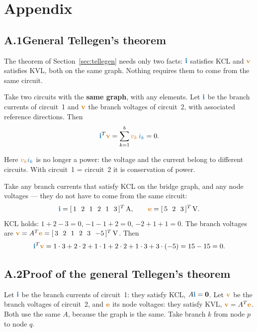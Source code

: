 \documentclass[11pt,a4paper]{article}
\newcommand{\Icol}[1]{\textcolor{ccur}{#1}}
\newcommand{\Vcol}[1]{\textcolor{cvolt}{#1}}
\newcommand{\uni}[1]{\,\mathrm{#1}}
\newcommand{\A}{\uni{A}}   \newcommand{\V}{\uni{V}}
\begin{document}
\clearpage
\section*{Appendix}

\subsection*{A.1\quad General Tellegen's theorem}

The theorem of Section~\ref{sec:tellegen} needs only two facts: $\Icol{\mathbf{i}}$
satisfies KCL and $\Vcol{\mathbf{v}}$ satisfies KVL, both on the same graph. Nothing requires
them to come from the same circuit.

\begin{ideabox}
Take two circuits with the \textbf{same graph}, with any elements. Let $\Icol{\mathbf{i}}$ be
the branch currents of circuit~1 and $\Vcol{\mathbf{v}}$ the branch voltages of circuit~2,
with associated reference directions. Then
\[
  \Icol{\mathbf{i}}^T\Vcol{\mathbf{v}} = \sum_{k=1}^{b} \Vcol{v_k}\,\Icol{i_k} = 0 .
\]
\end{ideabox}

Here $\Vcol{v_k}\Icol{i_k}$ is no longer a power: the voltage and the current belong to
different circuits. With circuit~1 = circuit~2 it is conservation of power.

\begin{examplebox}
Take any branch currents that satisfy KCL on the bridge graph, and any node
voltages --- they do not have to come from the same circuit:
\[
  \Icol{\mathbf{i}} = [\,1\ \ 2\ \ 1\ \ 2\ \ 1\ \ 3\,]^T\A ,
  \qquad
  \Vcol{\mathbf{e}} = [\,5\ \ 2\ \ 3\,]^T\V .
\]
KCL holds: $1 + 2 - 3 = 0$, $-1 - 1 + 2 = 0$, $-2 + 1 + 1 = 0$. The branch voltages are
$\Vcol{\mathbf{v}} = A^T\Vcol{\mathbf{e}} = [\,3\ \ 2\ \ 1\ \ 2\ \ 3\ \ {-5}\,]^T\V$. Then
\[
  \Icol{\mathbf{i}}^T\Vcol{\mathbf{v}}
  = 1\cdot 3 + 2\cdot 2 + 1\cdot 1 + 2\cdot 2 + 1\cdot 3 + 3\cdot(-5)
  = 15 - 15 = 0 .
\]
\end{examplebox}

\subsection*{A.2\quad Proof of the general Tellegen's theorem}

Let $\Icol{\mathbf{i}}$ be the branch currents of circuit~1: they satisfy KCL,
$A\Icol{\mathbf{i}} = \mathbf{0}$. Let $\Vcol{\mathbf{v}}$ be the branch voltages of
circuit~2, and $\Vcol{\mathbf{e}}$ its node voltages: they satisfy KVL,
$\Vcol{\mathbf{v}} = A^T\Vcol{\mathbf{e}}$. Both use the same $A$, because the graph is the
same. Take branch $k$ from node $p$ to node $q$.
\end{document}
